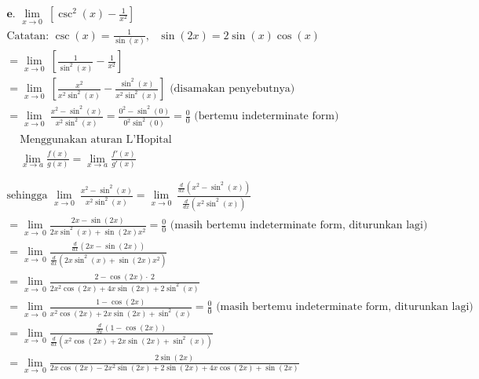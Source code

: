 \documentclass[12pt]{article}
\begin{document}
\begin{fleqn}[2em]
\begin{align*}
\boxed{
\begin{aligned}
  & \textbf{e. } \lim_{x \to 0}\:\left[\csc^2(x) - \frac{1}{x^2}\right] \\
  & \boxed{\text{Catatan: } \csc(x) = \frac{1}{\sin(x)},\:~\:\sin(2x) = 2\sin(x)\cos(x)} \\
  & = \lim_{x \to 0}\:\left[\frac{1}{\sin^2(x)} - \frac{1}{x^2}\right] \\
  & = \lim_{x \to 0}\:\left[\frac{x^2}{x^2\sin^2(x)} - \frac{\sin^2(x)}{x^2\sin^2(x)}\right] \text{ (disamakan penyebutnya)} \\
  & = \lim_{x \to 0}\:\frac{x^2 - \sin^2(x)}{x^2\sin^2(x)}
    = \frac{0^2 - \sin^2(0)}{0^2\sin^2(0)}
    = \frac{0}{0} \text{ (bertemu indeterminate form) } \\
  & \boxed{
    \begin{aligned}
      & \text{Menggunakan aturan L'Hopital} \\
      & \lim_{x \to a} \frac{f(x)}{g(x)} = \lim_{x \to a} \frac{f'(x)}{g'(x)} \\
    \end{aligned}
  } \\
  & \text{sehingga } \lim_{x \to 0}\:\frac{x^2 - \sin^2(x)}{x^2\sin^2(x)}
    = \lim_{x \to 0}\:\frac{\frac{d}{dx}\left(x^2 - \sin^2(x)\right)}{\frac{d}{dx}\left(x^2\sin^2(x)\right)} \\
  & = \lim _{x\to \:0}\frac{2x-\sin \left(2x\right)}{2x\sin ^2\left(x\right)+\sin \left(2x\right)x^2}
    = \frac{0}{0} \text{ (masih bertemu indeterminate form, diturunkan lagi)} \\
  & = \lim _{x\to \:0}\frac{\frac{d}{dx}(2x-\sin \left(2x\right))}{\frac{d}{dx}(2x\sin ^2\left(x\right)+\sin \left(2x\right)x^2)} \\
  & = \lim _{x\to \:0}\frac{2-\cos \left(2x\right)\cdot \:2}{2x^2\cos \left(2x\right)+4x\sin \left(2x\right)+2\sin ^2\left(x\right)} \\
  & = \lim _{x\to \:0} \frac{1-\cos \left(2x\right)}{x^2\cos \left(2x\right)+2x\sin \left(2x\right)+\sin ^2\left(x\right)} = \frac{0}{0} \text{ (masih bertemu indeterminate form, diturunkan lagi)} \\
  & = \lim _{x\to \:0} \frac{\frac{d}{dx}(1-\cos \left(2x\right))}{\frac{d}{dx}(x^2\cos \left(2x\right)+2x\sin \left(2x\right)+\sin ^2\left(x\right))} \\
  & = \lim _{x\to \:0} \frac{2\sin \left(2x\right)}{2x\cos \left(2x\right)-2x^2\sin \left(2x\right)+2\sin \left(2x\right)+4x\cos \left(2x\right)+\sin \left(2x\right)} \\

\end{aligned}}
\end{align*}
\end{fleqn}
\end{document}
